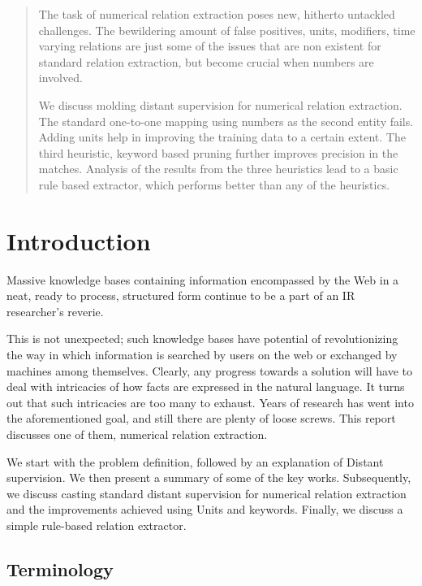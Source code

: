 \documentclass[a4paper,10pt]{article}
\begin{document}
\tableofcontents
\newpage
\begin{abstract}
The task of numerical relation extraction poses new, hitherto untackled challenges. The bewildering amount of false positives, units, 
modifiers, time varying relations are just some of the issues that are non existent for standard relation extraction, but become 
crucial when numbers are involved.

We discuss molding distant supervision for numerical relation extraction. The standard one-to-one mapping using numbers as the second entity 
fails. Adding units help in improving the training data to a certain extent. The third heuristic, keyword based pruning further improves 
precision in the matches.
Analysis of the results from the three heuristics lead to a basic rule based extractor, which performs better than any of the heuristics.


\end{abstract}

\newpage
\section{Introduction}
Massive knowledge bases containing information encompassed by the Web in a neat, ready to process, structured form continue to be a part of an IR researcher's reverie.

This is not unexpected; such knowledge bases have potential of revolutionizing the way in which information is searched by users on the web or exchanged by machines among
themselves. 
Clearly, any progress towards a solution will have to deal with intricacies of how facts are expressed in the natural language.
It turns out that such intricacies are too many to exhaust. Years of research has went into the aforementioned goal, and still
there are plenty of loose screws. This report discusses one of them, numerical relation extraction.

We start with the problem definition, followed by an explanation of Distant supervision. We then present a summary of some of the
key works. Subsequently, we discuss casting standard distant supervision for numerical relation extraction and the improvements achieved using
Units and keywords. Finally, we discuss a simple rule-based relation extractor.


\subsection{Terminology}
\end{document}
